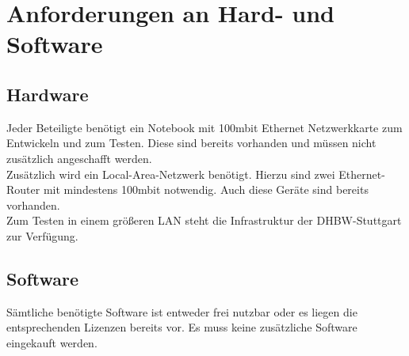 \chapter{Anforderungen an Hard- und Software}
\label{cha:anfo}

\section{Hardware}
\label{sec:hard}

Jeder Beteiligte benötigt ein Notebook mit 100mbit Ethernet Netzwerkkarte zum
Entwickeln und zum Testen. Diese sind bereits vorhanden und müssen nicht
zusätzlich angeschafft werden.\\ Zusätzlich wird ein Local-Area-Netzwerk
benötigt. Hierzu sind zwei Ethernet-Router mit mindestens 100mbit notwendig. Auch diese Geräte sind bereits
vorhanden.\\
Zum Testen in einem größeren LAN steht die Infrastruktur der DHBW-Stuttgart zur
Verfügung.

\section{Software}
\label{sec:soft}

Sämtliche benötigte Software ist entweder frei nutzbar oder es liegen die
entsprechenden Lizenzen bereits vor. Es muss keine zusätzliche Software
eingekauft werden.

